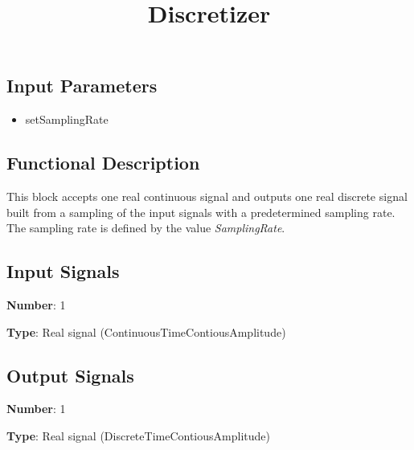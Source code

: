 \documentclass[a4paper]{article}
\title{Discretizer}
\begin{document}
\maketitle

\subsection*{Input Parameters}

\begin{multicols}{2}
	\begin{itemize}
		\item setSamplingRate
	\end{itemize}
\end{multicols}

\subsection*{Functional Description}

This block accepts one real continuous signal and outputs one real discrete signal built from a sampling of the input signals with a predetermined sampling rate. The sampling rate is defined by the value \textit{SamplingRate}.

\subsection*{Input Signals}

\textbf{Number}: 1

\textbf{Type}: Real signal (ContinuousTimeContiousAmplitude)

\subsection*{Output Signals}

\textbf{Number}: 1

\textbf{Type}: Real signal (DiscreteTimeContiousAmplitude)
\end{document}
